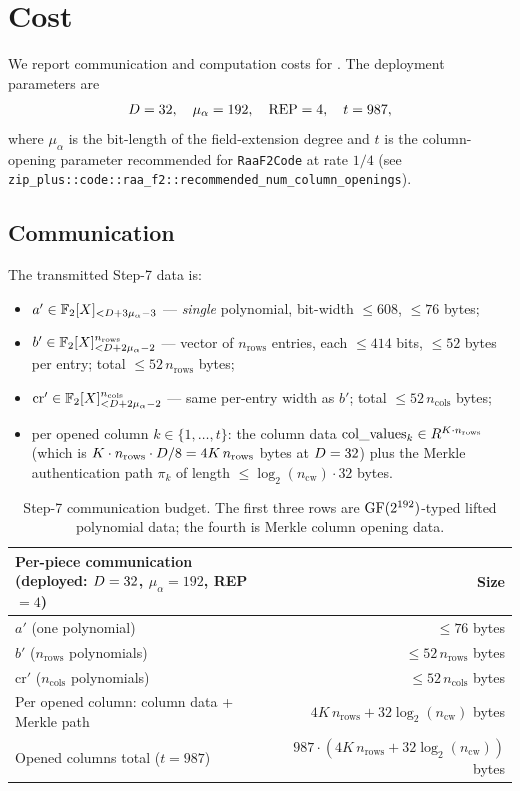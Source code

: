 \section{Cost}
\label{sec:cost}

We report communication and computation costs for .
The deployment parameters are
\[
  D = 32, \quad
  \mu_\alpha = 192, \quad
  \text{REP} = 4, \quad
  t = 987,
\]
where $\mu_\alpha$ is the bit-length of the field-extension degree
and $t$ is the column-opening parameter recommended for
\texttt{RaaF2Code} at rate $1/4$
(see \texttt{zip\_plus::code::raa\_f2::recommended\_num\_column\_openings}).

\subsection{Communication}

The transmitted Step-7 data is:
\begin{itemize}[leftmargin=2em]
  \item $a' \in \mathbb{F}_2[X]_{<D + 3\mu_\alpha - 3}$ — \emph{single} polynomial,
    bit-width $\le 608$, $\le 76$ bytes;
  \item $b' \in \mathbb{F}_2[X]_{<D + 2\mu_\alpha - 2}^{n_{\mathrm{rows}}}$ — vector of
    $n_{\mathrm{rows}}$ entries, each $\le 414$ bits, $\le 52$ bytes
    per entry; total $\le 52 \, n_{\mathrm{rows}}$ bytes;
  \item $\mathrm{cr}' \in \mathbb{F}_2[X]_{<D + 2\mu_\alpha - 2}^{n_{\mathrm{cols}}}$ —
    same per-entry width as $b'$; total $\le 52 \, n_{\mathrm{cols}}$ bytes;
  \item per opened column $k \in \{1,\ldots,t\}$: the column data
    $\mathrm{col\_values}_k \in R^{K \cdot n_{\mathrm{rows}}}$
    (which is $K \cdot n_{\mathrm{rows}} \cdot D/8 = 4 K
    \, n_{\mathrm{rows}}$ bytes at $D = 32$) plus the Merkle
    authentication path $\pi_k$ of length $\le \log_2(n_{\mathrm{cw}})
    \cdot 32$ bytes.
\end{itemize}

\begin{table}[h]
\centering
\renewcommand{\arraystretch}{1.2}
\begin{tabular}{l r}
\toprule
Per-piece communication (deployed: $D=32$, $\mu_\alpha=192$, REP$=4$) & Size \\
\midrule
$a'$ (one polynomial) & $\le 76$ bytes \\
$b'$ ($n_{\mathrm{rows}}$ polynomials) & $\le 52 \, n_{\mathrm{rows}}$ bytes \\
$\mathrm{cr}'$ ($n_{\mathrm{cols}}$ polynomials) & $\le 52 \, n_{\mathrm{cols}}$ bytes \\
Per opened column: column data + Merkle path & $4 K \, n_{\mathrm{rows}} + 32 \log_2(n_{\mathrm{cw}})$ bytes \\
Opened columns total ($t = 987$) & $987 \cdot (4 K \, n_{\mathrm{rows}} + 32 \log_2(n_{\mathrm{cw}}))$ bytes \\
\bottomrule
\end{tabular}
\caption{Step-7 communication budget. The first three rows are
$\mathrm{GF}(2^{192})$-typed lifted polynomial data; the fourth is Merkle column
opening data.}
\end{table}

